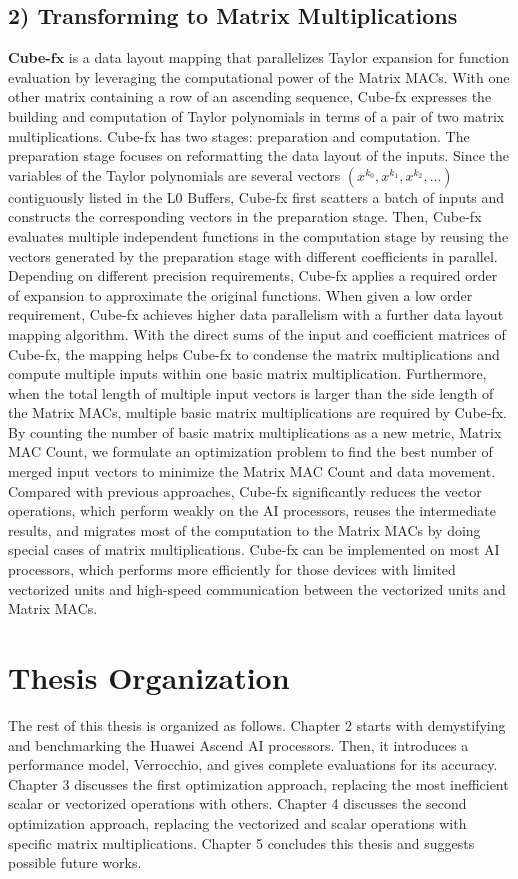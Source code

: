 \subsection{2) Transforming to Matrix Multiplications}

\textbf{Cube-}$\mathbf{fx}$ is a data layout mapping that parallelizes Taylor expansion for function evaluation by leveraging the computational power of the Matrix MACs. With one other matrix containing a row of an ascending sequence, Cube-fx expresses the building and computation of Taylor polynomials in terms of a pair of two matrix multiplications. Cube-fx has two stages: preparation and computation. The preparation stage focuses on reformatting the data layout of the inputs. Since the variables of the Taylor polynomials are several vectors $(x^{k_0}, x^{k_1}, x^{k_2}, ...)$ contiguously listed in the L0 Buffers, Cube-fx first scatters a batch of inputs and constructs the corresponding vectors in the preparation stage. Then, Cube-fx evaluates multiple independent functions in the computation stage by reusing the vectors generated by the preparation stage with different coefficients in parallel. Depending on different precision requirements, Cube-fx applies a required order of expansion to approximate the original functions. When given a low order requirement, Cube-fx achieves higher data parallelism with a further data layout mapping algorithm. With the direct sums of the input and coefficient matrices of Cube-fx, the mapping helps Cube-fx to condense the matrix multiplications and compute multiple inputs within one basic matrix multiplication. Furthermore, when the total length of multiple input vectors is larger than the side length of the Matrix MACs, multiple basic matrix multiplications are required by Cube-fx. By counting the number of basic matrix multiplications as a new metric, Matrix MAC Count, we formulate an optimization problem to find the best number of merged input vectors to minimize the Matrix MAC Count and data movement. Compared with previous approaches, Cube-fx significantly reduces the vector operations, which perform weakly on the AI processors, reuses the intermediate results, and migrates most of the computation to the Matrix MACs by doing special cases of matrix multiplications. Cube-fx can be implemented on most AI processors, which performs more efficiently for those devices with limited vectorized units and high-speed communication between the vectorized units and Matrix MACs.

\section{Thesis Organization}
\label{sec_1_4_organization}

The rest of this thesis is organized as follows. Chapter 2 starts with demystifying and benchmarking the Huawei Ascend AI processors. Then, it introduces a performance model, Verrocchio, and gives complete evaluations for its accuracy. Chapter 3 discusses the first optimization approach, replacing the most inefficient scalar or vectorized operations with others. Chapter 4 discusses the second optimization approach, replacing the vectorized and scalar operations with specific matrix multiplications. Chapter 5 concludes this thesis and suggests possible future works.